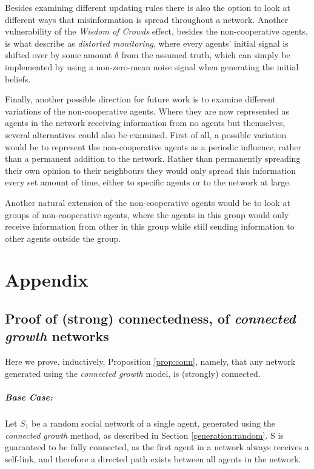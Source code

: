 \documentclass[a4paper, 12pt]{report}
\begin{document}
Besides examining different updating rules there is also the option to look at different ways that misinformation is spread throughout a network. Another vulnerability of the \emph{Wisdom of Crowds} effect, besides the non-cooperative agents, is what \parencite{amir2021robust} describe as \emph{distorted monitoring}, where every agents' initial signal is shifted over by some amount $\delta$ from the assumed truth, which can simply be implemented by using a non-zero-mean noise signal when generating the initial beliefs.

Finally, another possible direction for future work is to examine different variations of the non-cooperative agents. Where they are now represented as agents in the network receiving information from no agents but themselves, several alternatives could also be examined. First of all, a possible variation would be to represent the non-cooperative agents as a periodic influence, rather than a permanent addition to the network. Rather than permanently spreading their own opinion to their neighbours they would only spread this information every set amount of time, either to specific agents or to the network at large. 

Another natural extension of the non-cooperative agents would be to look at groups of non-cooperative agents, where the agents in this group would only receive information from other in this group while still sending information to other agents outside the group.

\newpage

\printbibliography

\newpage

\chapter{Appendix}
\section{Proof of (strong) connectedness, of \emph{connected growth} networks}

Here we prove, inductively, Proposition \ref{prop:conn}, namely, that any network generated using the \emph{connected growth} model, is (strongly) connected.

\label{proof:conn}
\paragraph{Base Case:}
Let $S_1$ be a random social network of a single agent, generated using the \emph{connected growth} method, as described in Section \ref{generation:random}.
S is guaranteed to be fully connected, as the first agent in a network always receives a self-link, and therefore a directed path exists between all agents in the network.
\end{document}
